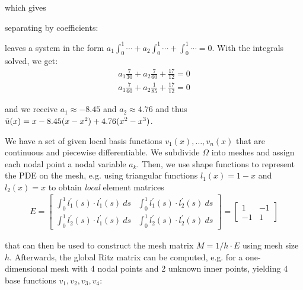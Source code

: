 which gives

separating by coefficients:

leaves a system in the form $a_1\int_0^1\cdots + a_2\int_0^1\cdots + \int_0^1\cdots = 0$. With the integrals solved, we get:
\begin{align*}
    a_1 \frac{7}{30} + a_2\frac{7}{60} + \frac{17}{12} = 0 \\
    a_1 \frac{7}{60} + a_2\frac{1}{85} + \frac{17}{12} = 0
\end{align*}

and we receive $a_1 \approx -8.45$ and $a_2 \approx 4.76$ and thus
$\tilde{u}(x) = x - 8.45 (x-x^2) + 4.76(x^2 - x^3)$.


We have a set of given local basis functions $v_1(x), \ldots, v_n(x)$ that are continuous and piecewise differentiable.
We subdivide $\Omega$ into meshes and assign each nodal point a nodal variable $a_k$.
Then, we use shape functions to represent the PDE on the mesh,
e.g. using triangular functions $l_1(x)=1-x$ and $l_2(x) = x$ to obtain \emph{local} element matrices
\begin{align*}
	E = 
	\begin{bmatrix}
		\int_0^1 l_1^\prime(s)\cdot l_1^\prime(s)\ ds & \int_0^1 l_1^\prime(s)\cdot l_2^\prime(s)\ ds \\
		\int_0^1 l_2^\prime(s)\cdot l_1^\prime(s)\ ds & \int_0^1 l_2^\prime(s)\cdot l_2^\prime(s)\ ds
	\end{bmatrix}
	=
	\begin{bmatrix}
		1 & -1 \\
		-1 & 1
	\end{bmatrix}
\end{align*}

that can then be used to construct the mesh matrix $M=1/h\cdot E$ using mesh size $h$.
Afterwards, the global Ritz matrix can be computed, e.g. for a one-dimensional mesh with 4 nodal points and 2 unknown inner points,
yielding 4 base functions $v_1,v_2,v_3,v_4$:

